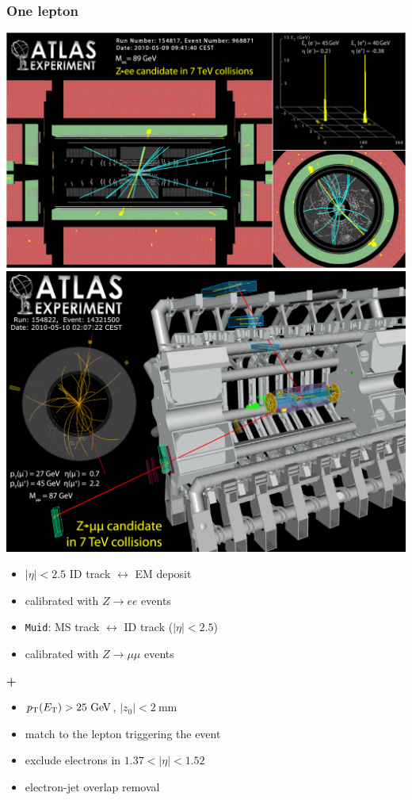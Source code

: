 \begin{frame}\frametitle{One lepton}
\footnotesize\centering

\includegraphics[width=.5\textwidth,height=0.5\textheight]{pics/Zee}
\includegraphics[width=.5\textwidth,height=0.5\textheight]{pics/Zmumu}

\begin{minipage}{.5\textwidth}\centering

\begin{itemize}
\item $|\eta|<2.5$ ID track $\leftrightarrow$ EM deposit
\item calibrated with $Z\to ee$ events
\end{itemize}

\end{minipage}\begin{minipage}{.5\textwidth}\centering

\begin{itemize}
\item \texttt{Muid}: MS track $\leftrightarrow$ ID track ($|\eta|<2.5$)
\item calibrated with $Z\to \mu\mu$ events
\end{itemize}

\end{minipage}

\begin{minipage}{.5\textwidth}\centering
{\cccolor \bfseries \large +}\\
\begin{itemize}
\item $\pt (\et) > 25\gev$, $|z_0|<2~$mm
\item match to the lepton triggering the event
\end{itemize}
\end{minipage}

\begin{itemize}
\item exclude electrons in $1.37< |\eta|< 1.52$
\item electron-jet overlap removal
\end{itemize}

\end{frame}



